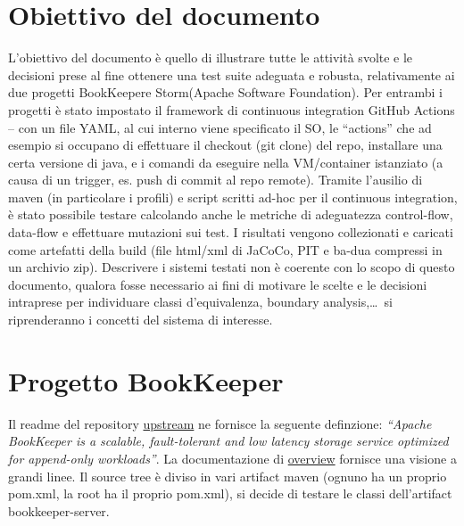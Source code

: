 \documentclass[10pt, a4paper]{article}
\title{\reporttitle}
\author{\authorsname\;(\univcode)}
\date{}
\def\bookkeeper{BookKeeper}
\def\storm{Storm}
\def\asf{Apache Software Foundation}
\begin{document}
	\maketitle
	\thispagestyle{empty}

	\tableofcontents

	\section*{Obiettivo del documento}
	L’obiettivo del documento è quello di illustrare tutte le attività svolte e le decisioni prese al fine ottenere una test suite
	adeguata e robusta, relativamente ai due progetti \bookkeeper e \storm (\asf). 
	Per entrambi i progetti è stato impostato il framework di continuous integration GitHub Actions – con un file YAML, 
	al cui interno viene specificato il SO, le “actions” che ad esempio si occupano di effettuare il checkout (git clone) del repo, 
	installare una certa versione di java, e i comandi da eseguire nella VM/container istanziato (a causa di un trigger, es. push di
	commit al repo remote). 
	Tramite l’ausilio di maven (in particolare i profili) e script scritti ad-hoc per il continuous integration, è stato possibile
	testare calcolando anche le metriche di adeguatezza control-flow, data-flow e effettuare mutazioni sui test. 
	I risultati vengono collezionati e caricati come artefatti della build
	(file html/xml di JaCoCo, PIT e ba-dua compressi in un archivio zip).
	Descrivere i sistemi testati non è coerente con lo scopo di questo documento, qualora fosse necessario ai fini 
	di motivare le scelte e le decisioni intraprese per individuare classi d’equivalenza, boundary analysis,\dots\,
	si riprenderanno i concetti del sistema di interesse.

	\pagebreak

	\section{Progetto \bookkeeper}
	Il readme del repository \href{https://github.com/apache/bookkeeper}{upstream} ne fornisce 
	la seguente definzione: \textit{“Apache BookKeeper is a scalable, 
	fault-tolerant and low latency storage service optimized for append-only workloads”}. 
	La documentazione di \href{https://bookkeeper.apache.org/archives/docs/master/bookkeeperOverview.html}{overview}
	fornisce una visione a grandi linee.
	Il source tree è diviso in vari artifact maven (ognuno ha un proprio pom.xml, la root ha il proprio pom.xml), 
	si decide di testare le classi dell'artifact bookkeeper-server. \\
	
\end{document}
